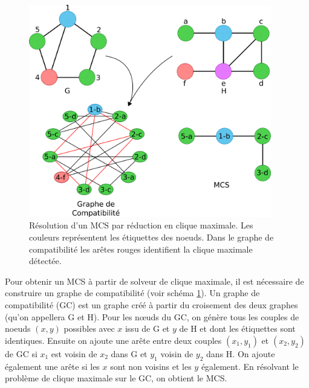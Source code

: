 \begin{figure}[!ht]
  \begin{center}
    \includegraphics[width=400px]{Figures/s2m/MCS-SI/clique_solve.png}
    \caption{\label{clique_solve_fig}Résolution d'un MCS par réduction en clique maximale.
    Les couleurs représentent les étiquettes des noeuds.
    Dans le graphe de compatibilité les arêtes rouges identifient la clique maximale détectée.}
  \end{center}
\end{figure}

Pour obtenir un MCS à partir de solveur de clique maximale, il est nécessaire de construire un graphe de compatibilité (voir schéma \ref{clique_solve_fig}).
Un graphe de compatibilité (GC) est un graphe créé à partir du croisement des deux graphes (qu'on appellera G et H).
Pour les n\oe{}uds du GC, on génère tous les couples de noeuds $(x, y)$ possibles avec $x$ issu de G et $y$ de H et dont les étiquettes sont identiques.
Ensuite on ajoute une arête entre deux couples $(x_1 , y_1)$ et $(x_2 , y_2)$ de GC si $x_1$ est voisin de $x_2$ dans G et $y_1$ voisin de $y_2$ dans H.
On ajoute également une arête si les $x$ sont non voisins et les $y$ également.
En résolvant le problème de clique maximale sur le GC, on obtient le MCS.


